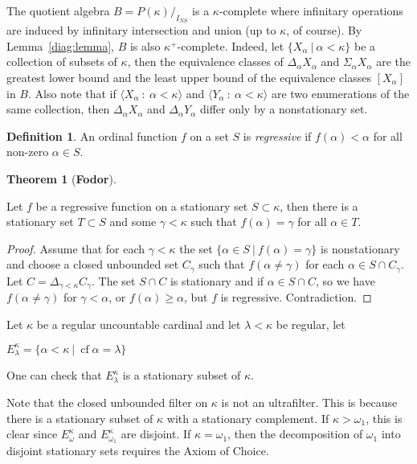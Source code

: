 \documentclass[8pt]{article}
\theoremstyle{definition}
\newtheorem{definition}{Definition}[section]
\theoremstyle{definition}
\newtheorem{theorem}{Theorem}[section]
\theoremstyle{definition}
\theoremstyle{definition}
\theoremstyle{definition}
\theoremstyle{definition}
\theoremstyle{definition}
\theoremstyle{definition}
\theoremstyle{definition}
\theoremstyle{definition}
\theoremstyle{definition}
\theoremstyle{definition}
\theoremstyle{definition}
\theoremstyle{definition}
\theoremstyle{question}
\begin{document}
The quotient algebra $B = P(\kappa)/_{I_{NS}}$ is a $\kappa$-complete where infinitary operations are induced
by infinitary intersection and union (up to $\kappa$, of course). By Lemma~\ref{diag:lemma}, $B$ is also $\kappa^+$-complete.
Indeed, let $\{ X_{\alpha} \: | \: \alpha < \kappa \}$ be a collection of subsets of $\kappa$, then the equivalence
classes of $\Delta_{\alpha} X_{\alpha}$ and $\Sigma_{\alpha} X_{\alpha}$ are the greatest lower bound and the 
least upper bound of the equivalence classes $[X_{\alpha}]$ in $B$. Also note that if $\langle X_{\alpha} \: : 
\: \alpha < \kappa \rangle$ and $\langle Y_{\alpha} \: : \: \alpha < \kappa \rangle$ are two enumerations of the same collection,
then $\Delta_{\alpha} X_{\alpha}$ and $\Delta_{\alpha} Y_{\alpha}$ differ only by a nonstationary set.

\begin{definition}
  An ordinal function $f$ on a set $S$ is \emph{regressive} if $f(\alpha) < \alpha$ for all non-zero $\alpha \in S$.
\end{definition}

\begin{theorem}[\bf Fodor]~\label{fodor}

  Let $f$ be a regressive function on a stationary set $S \subset \kappa$, then there is a stationary set
  $T \subset S$ and some $\gamma < \kappa$ such that $f(\alpha) = \gamma$ for all $\alpha \in T$.
\end{theorem}

\begin{proof}
  Assume that for each $\gamma < \kappa$ the set $\{ \alpha \in S \: | \: f(\alpha) = \gamma \}$
  is nonstationary and choose a closed unbounded set $C_{\gamma}$ such that $f(\alpha \neq \gamma)$
  for each $\alpha \in S \cap C_{\gamma}$. Let $C = \Delta_{\gamma < \kappa} C_{\gamma}$.
  The set $S \cap C$ is stationary and if $\alpha \in S \cap C$, so we have $f(\alpha \neq \gamma)$
  for $\gamma < \alpha$, or $f(\alpha) \geq \alpha$, but $f$ is regressive. Contradiction.
\end{proof}

Let $\kappa$ be a regular uncountable cardinal and let $\lambda < \kappa$ be regular, let
\begin{center}
  $E^{\kappa}_{\lambda} = \{ \alpha < \kappa \: | \: \operatorname{cf} \alpha = \lambda \}$
\end{center}
One can check that $E^{\kappa}_{\lambda}$ is a stationary subset of $\kappa$.

Note that the closed unbounded filter on $\kappa$ is not an ultrafilter. 
This is because there is a stationary subset of $\kappa$ with a stationary complement. If $\kappa > \omega_1$,
this is clear since $E_{\omega}^{\kappa}$ and $E_{\omega_1}^{\kappa}$ are disjoint. If $\kappa = \omega_1$, then
the decomposition of $\omega_1$ into disjoint stationary sets requires the Axiom of Choice.
\end{document}
